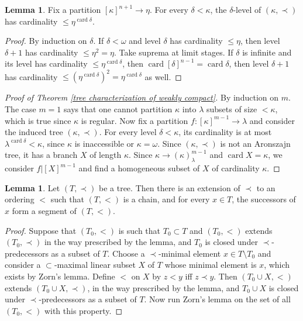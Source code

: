 \documentclass[12pt]{report}
\newcommand{\card}{\operatorname{card}}
\theoremstyle{definition}
\newtheorem{lemma}[theorem]{Lemma}
\begin{document}
\begin{lemma}
Fix a partition $[\kappa]^{n+1} \to \eta$.
For every $\delta < \kappa$, the $\delta$-level of $(\kappa, \prec)$ has cardinality $\leq \eta^{\card \delta}$.
\end{lemma}
\begin{proof}
By induction on $\delta$. If $\delta < \omega$ and level $\delta$ has cardinality $\leq \eta$, then level $\delta + 1$ has cardinality $\leq \eta^2 = \eta$.
Take suprema at limit stages.
If $\delta$ is infinite and its level has cardinality $\leq \eta^{\card \delta}$, then $\card [\delta]^{n-1} = \card \delta$, then level $\delta + 1$ has cardinality $\leq (\eta^{\card \delta})^2 = \eta^{\card \delta}$ as well.
\end{proof}

\begin{proof}[Proof of Theorem \ref{tree characterization of weakly compact}]
By induction on $m$. The case $m = 1$ says that one cannot partition $\kappa$ into $\lambda$ subsets of size $< \kappa$, which is true since $\kappa$ is regular.
Now fix a partition $f: [\kappa]^{m-1} \to \lambda$ and consider the induced tree $(\kappa, \prec)$.
For every level $\delta < \kappa$, its cardinality is at most $\lambda^{\card \delta} < \kappa$, since $\kappa$ is inaccessible or $\kappa = \omega$.
Since $(\kappa, \prec)$ is not an Aronszajn tree, it has a branch $X$ of length $\kappa$.
Since $\kappa \to (\kappa)_\lambda^{m-1}$ and $\card X = \kappa$, we consider $f|[X]^{m-1}$ and find a homogeneous subset of $X$ of cardinality $\kappa$.
\end{proof}

\begin{lemma}
Let $(T, \prec)$ be a tree. Then there is an extension of $\prec$ to an ordering $<$ such that $(T, <)$ is a chain, and for every $x \in T$, the successors of $x$ form a segment of $(T, <)$.
\end{lemma}
\begin{proof}
Suppose that $(T_0, <)$ is such that $T_0 \subset T$ and $(T_0, <)$ extends $(T_0, \prec)$ in the way prescribed by the lemma, and $T_0$ is closed under $\prec$-predecessors as a subset of $T$.
Choose a $\prec$-minimal element $x \in T \setminus T_0$ and consider a $\subset$-maximal linear subset $X$ of $T$ whose minimal element is $x$, which exists by Zorn's lemma.
Define $<$ on $X$ by $z < y$ iff $z \prec y$.
Then $(T_0 \cup X, <)$ extends $(T_0 \cup X, \prec)$, in the way prescribed by the lemma, and $T_0 \cup X$ is closed under $\prec$-predecessors as a subset of $T$.
Now run Zorn's lemma on the set of all $(T_0, <)$ with this property.
\end{proof}
\end{document}
